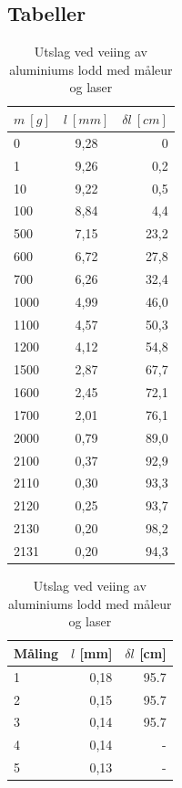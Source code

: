 \documentclass[reprint,norsk,notitlepage]{revtex4-2}
\begin{document}
\subsection{Tabeller}
\begin{table}[!ht]
    \begin{minipage}[t]{.4\linewidth}
    \centering
        \begin{tabular}[t]{l|c|r} 
        \toprule
        $m\ [g]$\hspace{0.125cm} &$l\ [mm]$\hspace{0.125cm} &$δl\ [cm]$ \\ 
        \midrule 
        0    &9,28 &0     \\ 
        1    &9,26 &0,2   \\ 
        10   &9,22 &0,5   \\ 
        100  &8,84 &4,4   \\ 
        500  &7,15 &23,2  \\ 
        600  &6,72 &27,8  \\ 
        700  &6,26 &32,4  \\ 
        1000 &4,99 &46,0  \\ 
        1100 &4,57 &50,3  \\ 
        1200 &4,12 &54,8  \\ 
        1500 &2,87 &67,7  \\ 
        1600 &2,45 &72,1  \\ 
        1700 &2,01 &76,1  \\ 
        2000 &0,79 &89,0  \\ 
        2100 &0,37 &92,9  \\ 
        2110 &0,30 &93,3  \\ 
        2120 &0,25 &93,7  \\ 
        2130 &0,20 &98,2  \\ 
        2131 &0,20 &94,3  \\ 
        \bottomrule
    \end{tabular}
    \caption{Masse og resultater fra målingene med måleur og laser.}\label{tab: maaleur and laser results}
    \end{minipage}\hspace{.125cm}
    \begin{minipage}[t]{.4\linewidth}
      \begin{tabular}[t]{l|r|r}
    \toprule
    Måling\hspace{0.05cm} &$l$ [mm] &$δl$ [cm] \\  
    \midrule
    1 &0,18 &95.7 \\  
    2 &0,15 &95.7 \\  
    3 &0,14 &95.7 \\  
    4 &0,14 & -\\  
    5 &0,13 & -\\  
    \bottomrule
  \end{tabular}
  \caption{Utslag ved veiing av aluminiums lodd med måleur og laser}
  \label{tab: aluminum weight results}
  \end{minipage}
\end{table}
\end{document}

